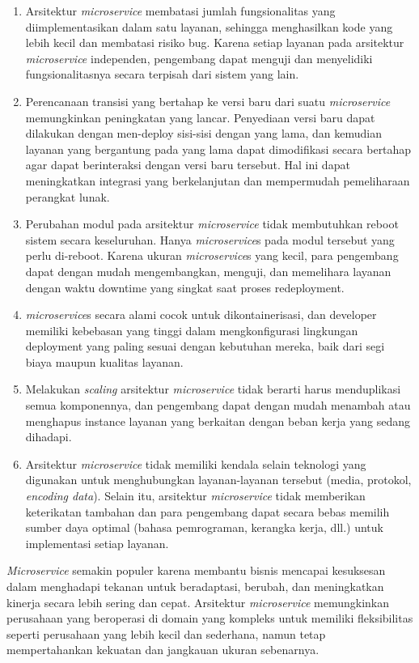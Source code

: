 \begin{enumerate}[nolistsep,leftmargin=0.5cm]
\item Arsitektur \textit{microservice} membatasi jumlah fungsionalitas yang diimplementasikan dalam satu layanan, sehingga menghasilkan kode yang lebih kecil dan membatasi risiko bug. Karena setiap layanan pada arsitektur \textit{microservice} independen, pengembang dapat menguji dan menyelidiki fungsionalitasnya secara terpisah dari sistem yang lain.
\item Perencanaan transisi yang bertahap ke versi baru dari suatu \textit{microservice} memungkinkan peningkatan yang lancar. Penyediaan versi baru dapat dilakukan dengan men-deploy sisi-sisi dengan yang lama, dan kemudian layanan yang bergantung pada yang lama dapat dimodifikasi secara bertahap agar dapat berinteraksi dengan versi baru tersebut. Hal ini dapat meningkatkan integrasi yang berkelanjutan dan mempermudah pemeliharaan perangkat lunak.
\item Perubahan modul pada arsitektur \textit{microservice} tidak membutuhkan reboot sistem secara keseluruhan. Hanya \textit{microservice}s pada modul tersebut yang perlu di-reboot. Karena ukuran \textit{microservice}s yang kecil, para pengembang dapat dengan mudah mengembangkan, menguji, dan memelihara layanan dengan waktu downtime yang singkat saat proses redeployment.
\item \textit{microservice}s secara alami cocok untuk dikontainerisasi, dan developer memiliki kebebasan yang tinggi dalam mengkonfigurasi lingkungan deployment yang paling sesuai dengan kebutuhan mereka, baik dari segi biaya maupun kualitas layanan.
\item Melakukan \textit{scaling} arsitektur \textit{microservice} tidak berarti harus menduplikasi semua komponennya, dan pengembang dapat dengan mudah menambah atau menghapus instance layanan yang berkaitan dengan beban kerja yang sedang dihadapi.
\item Arsitektur \textit{microservice} tidak memiliki kendala selain teknologi yang digunakan untuk menghubungkan layanan-layanan tersebut (media, protokol, \textit{encoding data}). Selain itu, arsitektur \textit{microservice} tidak memberikan keterikatan tambahan dan para pengembang dapat secara bebas memilih sumber daya optimal (bahasa pemrograman, kerangka kerja, dll.) untuk implementasi setiap layanan.
\end{enumerate}
\textit{Microservice} semakin populer karena membantu bisnis mencapai kesuksesan dalam menghadapi tekanan untuk beradaptasi, berubah, dan meningkatkan kinerja secara lebih sering dan cepat. Arsitektur \textit{microservice} memungkinkan perusahaan yang beroperasi di domain yang kompleks untuk memiliki fleksibilitas seperti perusahaan yang lebih kecil dan sederhana, namun tetap mempertahankan kekuatan dan jangkauan ukuran sebenarnya\cite{5}.\\

